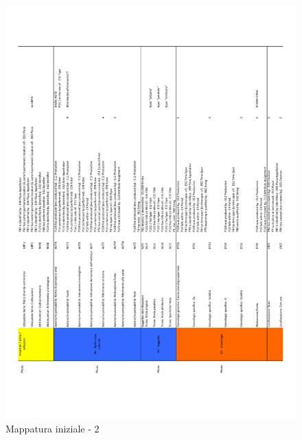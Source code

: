 \begin{center}
\begin{figure}[ht!]
    \includegraphics{images/Mapping-v3-2.pdf}
	\caption{Mappatura iniziale - 2}
	\label{fig:mapping-v3-2}
\end{figure}
\begin{figure}[ht!]
    \centering

\end{figure}
\end{center}
